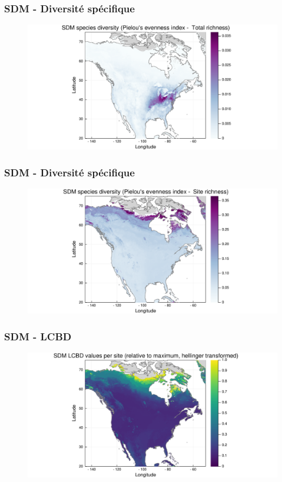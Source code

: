 \documentclass[10pt]{beamer}
\begin{document}
\begin{frame}
  \frametitle{SDM - Diversité spécifique}
  \begin{figure}
    \centering
    \hspace*{-2cm}\includegraphics[scale=0.5]{fig/sdm-diversity-pielou2.pdf}
  \end{figure}
\end{frame}

\begin{frame}
  \frametitle{SDM - Diversité spécifique}
  \begin{figure}
    \centering
    \hspace*{-2cm}\includegraphics[scale=0.5]{fig/sdm-diversity-pielou.pdf}
  \end{figure}
\end{frame}

\begin{frame}
  \frametitle{SDM - LCBD}
  \begin{figure}
    \centering
    \hspace*{-2cm}\includegraphics[scale=0.5]{fig/sdm-lcbd-transf.pdf}
  \end{figure}
\end{frame}
\end{document}
